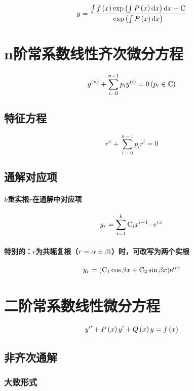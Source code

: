 \documentclass{article}
\begin{document}
\[y=\frac{\int{f\left(x\right)\exp\left(\int P\left(x\right)\mathrm dx\right)\mathrm dx}+\mathrm C}{\exp\left(\int P\left(x\right)\mathrm d x\right)}\]

\section{n阶常系数线性齐次微分方程}

\begin{definition}[]
    \[y^{\left(n\right)}+\sum_{i=0}^{n-1}p_iy^{\left(i\right)}=0\left(p_i\in\mathbb C\right)\]
\end{definition}

\subsection{特征方程}

\[r^n+\sum_{i=0}^{n-1}p_ir^i=0\]

\subsection{通解对应项}

\paragraph{$k$重实根$r$在通解中对应项}

\[y_r=\sum_{i=1}^k\mathrm C_ix^{i-1}\cdot\mathrm e^{rx}\]

\paragraph{特别的：$r$为共轭复根（$r=\alpha\pm\beta\mathrm i$）时，可改写为两个实根}

\[y_r=(\mathrm C_1\cos{\beta x}+\mathrm C_2\sin{\beta x})\mathrm e^{\alpha x}\]

\section{二阶常系数线性微分方程}

\begin{definition}[]
    \[y^{\prime\prime}+P\left(x\right)y^\prime+Q\left(x\right)y=f\left(x\right)\]
\end{definition}

\subsection{非齐次通解}

\subsubsection{大致形式}
\end{document}
